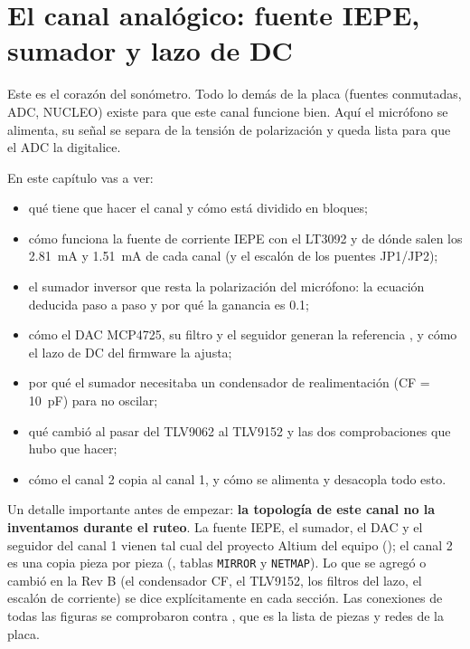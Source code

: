 \chapter[El canal analógico]{El canal analógico: fuente IEPE, sumador y lazo de DC}\label{cap:analog}

Este es el corazón del sonómetro. Todo lo demás de la placa (fuentes conmutadas, ADC, NUCLEO) existe para que este
canal funcione bien. Aquí el micrófono se alimenta, su señal se separa de la tensión de polarización y queda lista
para que el ADC la digitalice.

En este capítulo vas a ver:
\begin{itemize}
  \item qué tiene que hacer el canal y cómo está dividido en bloques;
  \item cómo funciona la fuente de corriente IEPE con el LT3092 y de dónde salen los \SI{2.81}{\milli\ampere} y
        \SI{1.51}{\milli\ampere} de cada canal (y el escalón de los puentes JP1/JP2);
  \item el sumador inversor que resta la polarización del micrófono: la ecuación deducida paso a paso y por qué la
        ganancia es \num{0.1};
  \item cómo el DAC MCP4725, su filtro y el seguidor generan la referencia , y cómo el lazo de DC del
        firmware la ajusta;
  \item por qué el sumador necesitaba un condensador de realimentación (CF = \SI{10}{\pico\farad}) para no oscilar;
  \item qué cambió al pasar del TLV9062 al TLV9152 y las dos comprobaciones que hubo que hacer;
  \item cómo el canal 2 copia al canal 1, y cómo se alimenta y desacopla todo esto.
\end{itemize}

Un detalle importante antes de empezar: \textbf{la topología de este canal no la inventamos durante el ruteo}. La
fuente IEPE, el sumador, el DAC y el seguidor del canal 1 vienen tal cual del proyecto Altium del equipo
(); el canal 2 es una copia pieza por pieza (, tablas
\texttt{MIRROR} y \texttt{NETMAP}). Lo que se agregó o cambió en la Rev B (el condensador CF, el TLV9152, los filtros
del lazo, el escalón de corriente) se dice explícitamente en cada sección. Las conexiones de todas las figuras se
comprobaron contra , que es la lista de piezas y redes de la placa.

